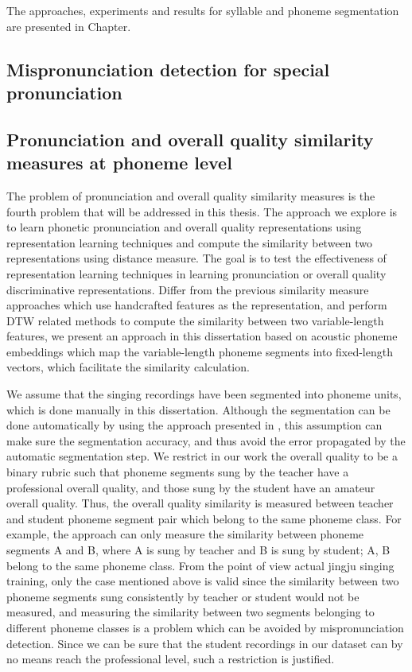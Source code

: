 The approaches, experiments and results for syllable and phoneme segmentation are presented in Chapter.

\subsection{Mispronunciation detection for special pronunciation}

\subsection{Pronunciation and overall quality similarity measures at phoneme level}\label{sec:ch3:similarity_formulation}

The problem of pronunciation and overall quality similarity measures is the fourth problem that will be addressed in this thesis. The approach we explore is to learn phonetic pronunciation and overall quality representations using representation learning techniques and compute the similarity between two representations using distance measure. The goal is to test the effectiveness of representation learning techniques in learning pronunciation or overall quality discriminative representations. Differ from the previous similarity measure approaches which use handcrafted features as the representation, and perform DTW related methods to compute the similarity between two variable-length features, we present an approach in this dissertation based on acoustic phoneme embeddings which map the variable-length phoneme segments into fixed-length vectors, which facilitate the similarity calculation.

We assume that the singing recordings have been segmented into phoneme units, which is done manually in this dissertation. Although the segmentation can be done automatically by using the approach presented in , this assumption can make sure the segmentation accuracy, and thus avoid the error propagated by the automatic segmentation step. We restrict in our work the overall quality to be a binary rubric such that phoneme segments sung by the teacher have a professional overall quality, and those sung by the student have an amateur overall quality. Thus, the overall quality similarity is measured between teacher and student phoneme segment pair which belong to the same phoneme class. For example, the approach can only measure the similarity between phoneme segments A and B, where A is sung by teacher and B is sung by student; A, B belong to the same phoneme class. From the point of view actual jingju singing training, only the case mentioned above is valid since the similarity between two phoneme segments sung consistently by teacher or student would not be measured, and measuring the similarity between two segments belonging to different phoneme classes is a problem which can be avoided by mispronunciation detection. Since we can be sure that the student recordings in our dataset can by no means reach the professional level, such a restriction is justified.

